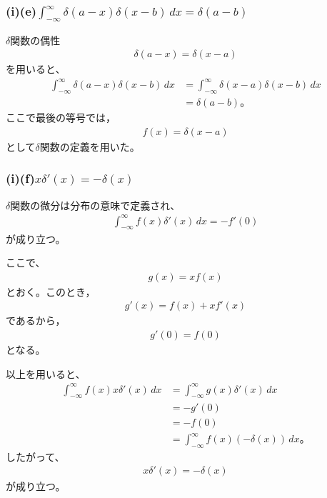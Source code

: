 \documentclass[platex、dvipdfmx、a4paper]{jsarticle}
\begin{document}
  \subsubsection*{(i)(e)$\int_{-\infty}^{\infty}\delta(a-x)\delta(x-b)\,dx=\delta(a-b)$}

  $\delta$関数の偶性
  \begin{align*}
    \delta(a-x)=\delta(x-a)
  \end{align*}
  を用いると、
  \begin{align*}
    \int_{-\infty}^{\infty}\delta(a-x)\delta(x-b)\,dx
    &= \int_{-\infty}^{\infty}\delta(x-a)\delta(x-b)\,dx \\
    &= \delta(a-b)。
  \end{align*}
  ここで最後の等号では，
  \begin{align*}
    f(x)=\delta(x-a)
  \end{align*}
  として$\delta$関数の定義を用いた。

  \subsubsection*{(i)(f)$x\delta'(x)=-\delta(x)$}

  $\delta$関数の微分は分布の意味で定義され、
  \begin{align*}
    \int_{-\infty}^{\infty} f(x)\delta'(x)\,dx
    = -f'(0)
  \end{align*}
  が成り立つ。

  ここで、
  \begin{align*}
    g(x)=xf(x)
  \end{align*}
  とおく。このとき，
  \begin{align*}
    g'(x)=f(x)+xf'(x)
  \end{align*}
  であるから，
  \begin{align*}
    g'(0)=f(0)
  \end{align*}
  となる。

  以上を用いると、
  \begin{align*}
    \int_{-\infty}^{\infty} f(x)x\delta'(x)\,dx
    &= \int_{-\infty}^{\infty} g(x)\delta'(x)\,dx \\
    &= -g'(0) \\
    &= -f(0) \\
    &= \int_{-\infty}^{\infty} f(x)(-\delta(x))\,dx。
  \end{align*}
  したがって、
  \begin{align*}
    x\delta'(x)=-\delta(x)
  \end{align*}
  が成り立つ。
\end{document}
